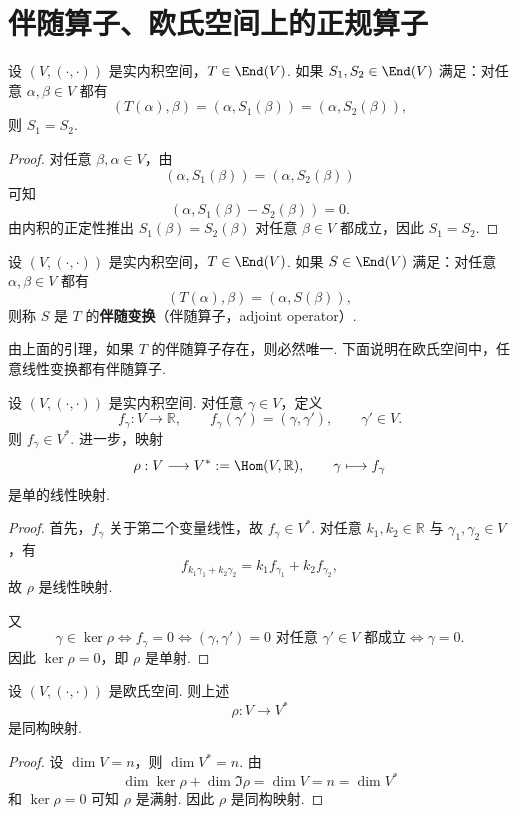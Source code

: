 \section{伴随算子、欧氏空间上的正规算子}



\begin{lemma}
	设 $(V,(\cdot,\cdot))$ 是实内积空间，$T\in\End(V)$. 如果 $S_1,S_2\in\End(V)$ 满足：对任意 $\alpha,\beta\in V$ 都有
	\[
	(T(\alpha),\beta)=(\alpha,S_1(\beta))=(\alpha,S_2(\beta)),
	\]
	则 $S_1=S_2$.
\end{lemma}
\begin{proof}
	对任意 $\beta,\alpha\in V$，由
	\[
	(\alpha,S_1(\beta))=(\alpha,S_2(\beta))
	\]
	可知
	\[
	(\alpha,S_1(\beta)-S_2(\beta))=0.
	\]
	由内积的正定性推出 $S_1(\beta)=S_2(\beta)$ 对任意 $\beta\in V$ 都成立，因此 $S_1=S_2$.
\end{proof}

\begin{definition}
	设 $(V,(\cdot,\cdot))$ 是实内积空间，$T\in\End(V)$. 如果 $S\in\End(V)$ 满足：对任意 $\alpha,\beta\in V$ 都有
	\[
	(T(\alpha),\beta)=(\alpha,S(\beta)),
	\]
	则称 $S$ 是 $T$ 的\textbf{伴随变换}（伴随算子，adjoint operator）.
\end{definition}

由上面的引理，如果 $T$ 的伴随算子存在，则必然唯一. 下面说明在欧氏空间中，任意线性变换都有伴随算子.

\begin{lemma}
	设 $(V,(\cdot,\cdot))$ 是实内积空间. 对任意 $\gamma\in V$，定义
	\[
	f_\gamma:V\longrightarrow\mathbb{R},
	\qquad
	f_\gamma(\gamma')=(\gamma,\gamma'),
	\qquad \gamma'\in V.
	\]
	则 $f_\gamma\in V^*$. 进一步，映射
	\[
	\rho:V\longrightarrow V^*:=\Hom(V,\mathbb{R}),
	\qquad
	\gamma\longmapsto f_\gamma
	\]
	是单的线性映射.
\end{lemma}
\begin{proof}
	首先，$f_\gamma$ 关于第二个变量线性，故 $f_\gamma\in V^*$. 对任意 $k_1,k_2\in\mathbb{R}$ 与 $\gamma_1,\gamma_2\in V$，有
	\[
	f_{k_1\gamma_1+k_2\gamma_2}=k_1f_{\gamma_1}+k_2f_{\gamma_2},
	\]
	故 $\rho$ 是线性映射.
	
	又
	\[
	\gamma\in\ker\rho
	\Longleftrightarrow f_\gamma=0
	\Longleftrightarrow (\gamma,\gamma')=0\text{ 对任意 }\gamma'\in V\text{ 都成立}
	\Longleftrightarrow \gamma=0.
	\]
	因此 $\ker\rho=0$，即 $\rho$ 是单射.
\end{proof}

\begin{corollary}
	设 $(V,(\cdot,\cdot))$ 是欧氏空间. 则上述
	\[
	\rho:V\longrightarrow V^*
	\]
	是同构映射.
\end{corollary}
\begin{proof}
	设 $\dim V=n$，则 $\dim V^*=n$. 由
	\[
	\dim\ker\rho+\dim\Im \rho=\dim V=n=\dim V^*
	\]
	和 $\ker\rho=0$ 可知 $\rho$ 是满射. 因此 $\rho$ 是同构映射.
\end{proof}

